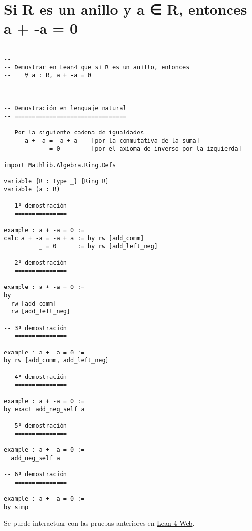 \section{Si R es un anillo y a ∈ R, entonces a + -a = 0}
\label{sec:orgae8a789}
\begin{verbatim}
-- ---------------------------------------------------------------------
-- Demostrar en Lean4 que si R es un anillo, entonces
--    ∀ a : R, a + -a = 0
-- ---------------------------------------------------------------------

-- Demostración en lenguaje natural
-- ================================

-- Por la siguiente cadena de igualdades
--    a + -a = -a + a    [por la conmutativa de la suma]
--           = 0         [por el axioma de inverso por la izquierda]

import Mathlib.Algebra.Ring.Defs

variable {R : Type _} [Ring R]
variable (a : R)

-- 1ª demostración
-- ===============

example : a + -a = 0 :=
calc a + -a = -a + a := by rw [add_comm]
          _ = 0      := by rw [add_left_neg]

-- 2ª demostración
-- ===============

example : a + -a = 0 :=
by
  rw [add_comm]
  rw [add_left_neg]

-- 3ª demostración
-- ===============

example : a + -a = 0 :=
by rw [add_comm, add_left_neg]

-- 4ª demostración
-- ===============

example : a + -a = 0 :=
by exact add_neg_self a

-- 5ª demostración
-- ===============

example : a + -a = 0 :=
  add_neg_self a

-- 6ª demostración
-- ===============

example : a + -a = 0 :=
by simp
\end{verbatim}
Se puede interactuar con las pruebas anteriores en \href{https://lean.math.hhu.de/\#url=https://raw.githubusercontent.com/jaalonso/Calculemus2/main/src/Suma\_con\_opuesto.lean}{Lean 4 Web}.

